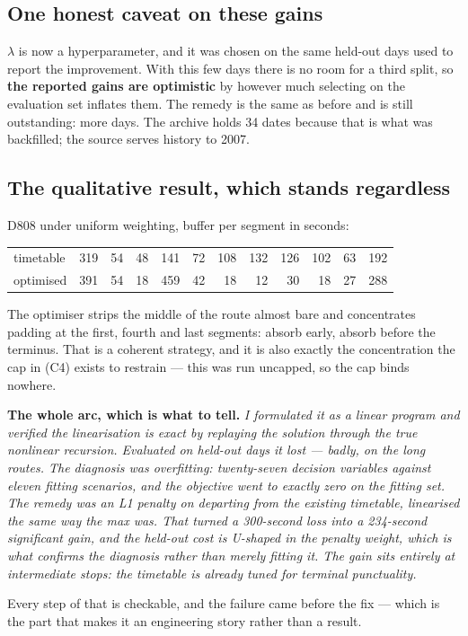 \documentclass[11pt,a4paper]{article}
\begin{document}
\subsection*{One honest caveat on these gains}

$\lambda$ is now a hyperparameter, and it was chosen on the same held-out days used to report
the improvement. With this few days there is no room for a third split, so \textbf{the
reported gains are optimistic} by however much selecting on the evaluation set inflates them.
The remedy is the same as before and is still outstanding: more days. The archive holds 34
dates because that is what was backfilled; the source serves history to 2007.

\subsection*{The qualitative result, which stands regardless}

D808 under uniform weighting, buffer per segment in seconds:

\begin{center}
\small
\begin{tabular}{@{}lrrrrrrrrrrr@{}}
\toprule
timetable & 319 & 54 & 48 & 141 & 72 & 108 & 132 & 126 & 102 & 63 & 192 \\
optimised & 391 & 54 & 18 & 459 & 42 & 18 & 12 & 30 & 18 & 27 & 288 \\
\bottomrule
\end{tabular}
\end{center}

\noindent The optimiser strips the middle of the route almost bare and concentrates padding
at the first, fourth and last segments: absorb early, absorb before the terminus. That is a
coherent strategy, and it is also exactly the concentration the cap in (C4) exists to
restrain --- this was run uncapped, so the cap binds nowhere.

\begin{keybox}
\textbf{The whole arc, which is what to tell.} \emph{I formulated it as a linear program and
verified the linearisation is exact by replaying the solution through the true nonlinear
recursion. Evaluated on held-out days it lost --- badly, on the long routes. The diagnosis was
overfitting: twenty-seven decision variables against eleven fitting scenarios, and the
objective went to exactly zero on the fitting set. The remedy was an L1 penalty on departing
from the existing timetable, linearised the same way the max was. That turned a 300-second
loss into a 234-second significant gain, and the held-out cost is U-shaped in the penalty
weight, which is what confirms the diagnosis rather than merely fitting it. The gain sits
entirely at intermediate stops: the timetable is already tuned for terminal punctuality.}

\medskip
Every step of that is checkable, and the failure came before the fix --- which is the part
that makes it an engineering story rather than a result.
\end{keybox}
\end{document}
